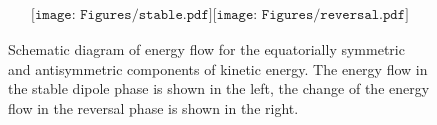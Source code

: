 \begin{figure}[ht]
\begin{center}
\[
\begin{array}{cc}
\texttt{[image: Figures/stable.pdf]}
\texttt{[image: Figures/reversal.pdf]}
\end{array}
\]
\end{center}
\caption{
Schematic diagram of energy flow for the equatorially symmetric and antisymmetric components of kinetic energy. 
The energy flow in the stable dipole phase is shown in the left, the change of the energy flow in the reversal phase is shown in the right. 
}
\label{Fig:schematic_reversal}
\end{figure}